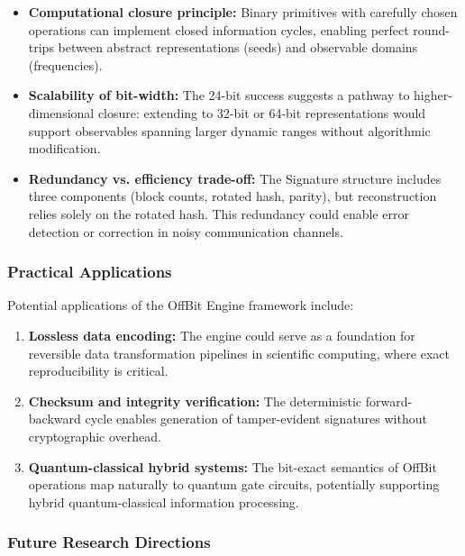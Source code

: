 \documentclass[11pt,letterpaper]{article}
\begin{document}
\begin{itemize}
    \item \textbf{Computational closure principle:} Binary primitives with carefully chosen operations can implement closed information cycles, enabling perfect round-trips between abstract representations (seeds) and observable domains (frequencies).

    \item \textbf{Scalability of bit-width:} The 24-bit success suggests a pathway to higher-dimensional closure: extending to 32-bit or 64-bit representations would support observables spanning larger dynamic ranges without algorithmic modification.

    \item \textbf{Redundancy vs. efficiency trade-off:} The Signature structure includes three components (block counts, rotated hash, parity), but reconstruction relies solely on the rotated hash. This redundancy could enable error detection or correction in noisy communication channels.
\end{itemize}

\subsubsection{Practical Applications}

Potential applications of the OffBit Engine framework include:

\begin{enumerate}
    \item \textbf{Lossless data encoding:} The engine could serve as a foundation for reversible data transformation pipelines in scientific computing, where exact reproducibility is critical.

    \item \textbf{Checksum and integrity verification:} The deterministic forward-backward cycle enables generation of tamper-evident signatures without cryptographic overhead.

    \item \textbf{Quantum-classical hybrid systems:} The bit-exact semantics of OffBit operations map naturally to quantum gate circuits, potentially supporting hybrid quantum-classical information processing.
\end{enumerate}

\subsubsection{Future Research Directions}
\end{document}
